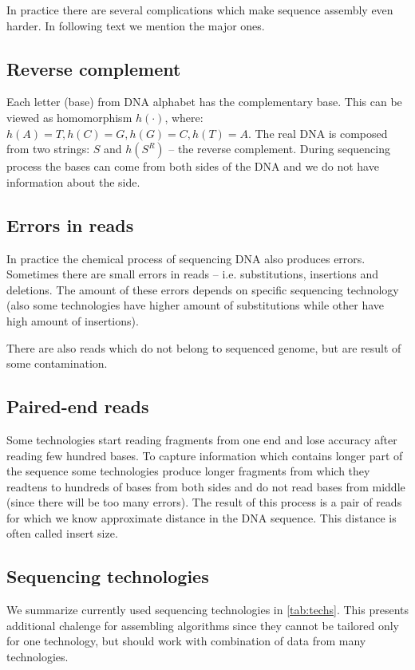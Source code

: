 In practice there are several complications which make sequence assembly even harder.
In following text we mention the major ones.

\subsection{Reverse complement}

Each letter (base) from DNA alphabet has the complementary base. This can
be viewed as homomorphism $h(\cdot)$, where: $h(A) = T, h(C) = G, h(G) = C, h(T) = A$.
The real DNA is composed from two strings: $S$ and $h(S^R)$ -- the reverse complement.
During sequencing process the bases can come from both sides of the DNA and
we do not have information about the side.

\subsection{Errors in reads}

In practice the chemical process of sequencing DNA also produces errors.
Sometimes there are small errors in reads -- i.e. substitutions, insertions
and deletions. The amount of these errors depends on specific sequencing technology
(also some technologies have higher amount of substitutions while other
have high amount of insertions).

There are also reads which do not belong to sequenced genome, but are result
of some contamination.

\subsection{Paired-end reads}

Some technologies start reading fragments from one end and lose accuracy after
reading few hundred bases. To capture information which contains longer part of the
sequence some technologies produce longer fragments from which they readtens to hundreds
of bases from both sides and do not read bases from middle (since there will be
too many errors). The result of this process is a pair of reads for which we know approximate
distance in the DNA sequence. This distance is often called insert size.

\subsection{Sequencing technologies}

We summarize currently used sequencing technologies in \ref{tab:techs}.
This presents additional chalenge for assembling algorithms since they
cannot be tailored only for one technology, but should work with combination
of data from many technologies.

